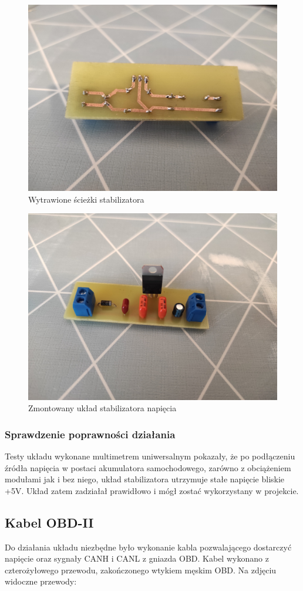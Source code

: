 \documentclass[10pt,a4paper]{scrartcl}
\begin{document}
		\begin{figure}
			\centering
			\includegraphics[width=0.7\linewidth]{wytrawione_ścieżki}
			\caption[Wytrawione ścieżki stabilizatora]{Wytrawione ścieżki stabilizatora}
			\label{fig:wytrawionesciezki}
		\end{figure}
		
		\begin{figure}
			\centering
			\includegraphics[width=0.7\linewidth]{pcb_gotowe}
			\caption[Zmontowany układ]{Zmontowany układ stabilizatora napięcia}
			\label{fig:pcbgotowe}
		\end{figure}
				\subsubsection{Sprawdzenie poprawności działania}
				Testy układu wykonane multimetrem uniwersalnym pokazały, że po podłączeniu źródła napięcia w postaci akumulatora samochodowego, zarówno z obciążeniem modułami jak i bez niego, układ stabilizatora utrzymuje stałe napięcie bliskie +5V. Układ zatem zadziałał prawidłowo i mógł zostać wykorzystany w projekcie.
		\subsection{Kabel OBD-II}
		Do działania układu niezbędne było wykonanie kabla pozwalającego dostarczyć napięcie oraz sygnały CANH i CANL z gniazda OBD. Kabel wykonano z czterożyłowego przewodu, zakończonego wtykiem męskim OBD. Na zdjęciu widoczne przewody: 
		
\end{document}
